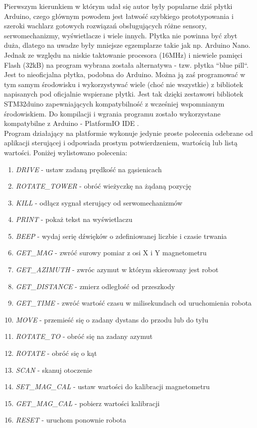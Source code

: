 Pierwszym kierunkiem w którym udał się autor były popularne dziś płytki Arduino, czego głównym powodem jest łatwość szybkiego prototypowania i szeroki wachlarz gotowych rozwiązań obsługujących różne sensory, serwomechanizmy, wyświetlacze i wiele innych. Płytka nie powinna być zbyt duża, dlatego na uwadze były mniejsze egzemplarze takie jak np. Arduino Nano. Jednak ze względu na niskie taktowanie procesora (16MHz) i niewiele pamięci Flash (32kB) na program wybrana została alternatywa - tzw. płytka ``blue pill``\cite{bluepill}. Jest to nieoficjalna płytka, podobna do Arduino. Można ją zaś programować w tym samym środowisku i wykorzystywać wiele (choć nie wszystkie) z bibliotek napisanych pod oficjalnie wspierane płytki. Jest tak dzięki zestawowi bibliotek STM32duino \cite{stm32duino-github} zapewniających kompatybilność z wcześniej wspomnianym środowiskiem. Do kompilacji i wgrania programu zostało wykorzystane kompatybilne z Arduino - PlatformIO IDE \cite{platformio}.
\\

Program działający na platformie wykonuje jedynie proste polecenia odebrane od aplikacji sterującej i odpowiada prostym potwierdzeniem, wartością lub listą wartości. Poniżej wylistowano polecenia:

\begin{enumerate}
    \item \emph{DRIVE} - ustaw zadaną prędkość na gąsienicach
    \item \emph{ROTATE\_TOWER} - obróć wieżyczkę na żądaną pozycję
    \item \emph{KILL} - odłącz sygnał sterujący od serwomechanizmów
    \item \emph{PRINT} - pokaż tekst na wyświetlaczu
    \item \emph{BEEP} - wydaj serię dźwięków o zdefiniowanej liczbie i czasie trwania
    \item \emph{GET\_MAG} - zwróć surowy pomiar z osi X i Y magnetometru
    \item \emph{GET\_AZIMUTH} - zwróc azymut w którym skierowany jest robot
    \item \emph{GET\_DISTANCE} - zmierz odległość od przeszkody
    \item \emph{GET\_TIME} - zwróć wartość czasu w milisekundach od uruchomienia robota
    \item \emph{MOVE} - przemieść się o zadany dystans do przodu lub do tyłu
    \item \emph{ROTATE\_TO} - obróć się na zadany azymut
    \item \emph{ROTATE} - obróć się o kąt
    \item \emph{SCAN} - skanuj otoczenie
    \item \emph{SET\_MAG\_CAL} - ustaw wartości do kalibracji magnetometru
    \item \emph{GET\_MAG\_CAL} - pobierz wartości kalibracji
    \item \emph{RESET} - uruchom ponownie robota
\end{enumerate}

